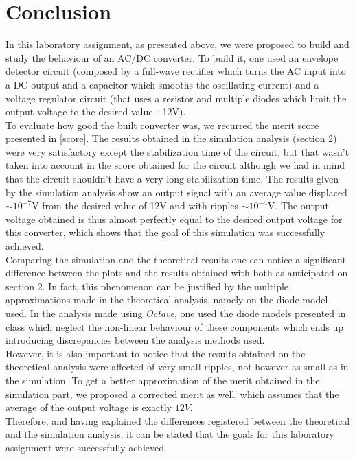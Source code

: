 \section{Conclusion}
In this laboratory assignment, as presented above, we were proposed to build and study the behaviour of an AC/DC converter. To build it, one used an envelope detector circuit (composed by a full-wave rectifier which turns the AC input into a DC output and a capacitor which smooths the oscillating current) and a voltage regulator circuit (that uses a resistor and multiple diodes which limit the output voltage to the desired value - 12V).\\

To evaluate how good the built converter was, we recurred the merit score presented in \eqref{score}. The results obtained in the simulation analysis (section 2) were very satisfactory except the stabilization time of the circuit, but that wasn't taken into account in the score obtained for the circuit although we had in mind that the circuit shouldn't have a very long stabilization time. The results given by the simulation analysis show an output signal with an average value displaced $\sim 10^{-7}$V from the desired value of 12V and with ripples $\sim 10^{-4}$V. The output voltage obtained is thus almost perfectly equal to the desired output voltage for this converter, which shows that the goal of this simulation was successfully achieved.\\

Comparing the simulation and the theoretical results one can notice a significant difference between the plots and the results obtained with both as anticipated on section 2. In fact, this phenomenon can be justified by the multiple approximations made in the theoretical analysis, namely on the diode model used. In the analysis made using \textit{Octave}, one used the diode models presented in class which neglect the non-linear behaviour of these components which ends up introducing discrepancies between the analysis methods used.\\

However, it is also important to notice that the results obtained on the theoretical analysis were affected of very small ripples, not however as small as in the simulation. To get a better approximation of the merit obtained in the simulation part, we proposed a corrected merit as well, which assumes that the average of the output voltage is exactly $12V$.\\

Therefore, and having explained the differences registered between the theoretical and the simulation analysis, it can be stated that the goals for this laboratory assignment were successfully achieved.
